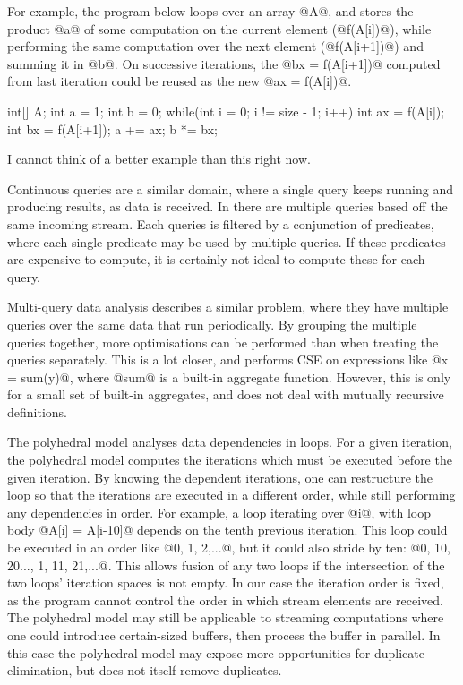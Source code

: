 For example, the program below loops over an array @A@, and stores the product @a@ of some computation on the current element (@f(A[i])@), while performing the same computation over the next element (@f(A[i+1])@) and summing it in @b@.
On successive iterations, the @bx = f(A[i+1])@ computed from last iteration could be reused as the new @ax = f(A[i])@.
\begin{code}
int[] A;
int a = 1;
int b = 0;
while(int i = 0; i != size - 1; i++)  {
  int ax = f(A[i]);
  int bx = f(A[i+1]);
  a += ax;
  b *= bx;
}
\end{code}

I cannot think of a better example than this right now.

Continuous queries are a similar domain, where a single query keeps running and producing results, as data is received.
In \cite{munagala2007optimization} there are multiple queries based off the same incoming stream.
Each queries is filtered by a conjunction of predicates, where each single predicate may be used by multiple queries.
If these predicates are expensive to compute, it is certainly not ideal to compute these for each query.

Multi-query data analysis\cite{andrade2003efficient} describes a similar problem, where they have multiple queries over the same data that run periodically.
By grouping the multiple queries together, more optimisations can be performed than when treating the queries separately.
This is a lot closer, and performs CSE on expressions like @x = sum(y)@, where @sum@ is a built-in aggregate function.
However, this is only for a small set of built-in aggregates, and does not deal with mutually recursive definitions.


The polyhedral model\cite{benabderrahmane2010polyhedral} analyses data dependencies in loops.
For a given iteration, the polyhedral model computes the iterations which must be executed before the given iteration.
By knowing the dependent iterations, one can restructure the loop so that the iterations are executed in a different order, while still performing any dependencies in order.
For example, a loop iterating over @i@, with loop body @A[i] = A[i-10]@ depends on the tenth previous iteration.
This loop could be executed in an order like @0, 1, 2,...@, but it could also stride by ten: @0, 10, 20..., 1, 11, 21,...@.
This allows fusion of any two loops if the intersection of the two loops' iteration spaces is not empty.
In our case the iteration order is fixed, as the program cannot control the order in which stream elements are received.
The polyhedral model may still be applicable to streaming computations where one could introduce certain-sized buffers, then process the buffer in parallel.
In this case the polyhedral model may expose more opportunities for duplicate elimination, but does not itself remove duplicates.

